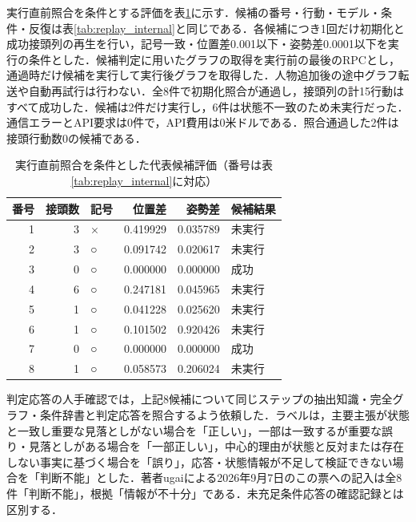 実行直前照合を条件とする評価を表\ref{tab:replay_gated}に示す．候補の番号・行動・モデル・条件・反復は表\ref{tab:replay_internal}と同じである．各候補につき1回だけ初期化と成功接頭列の再生を行い，記号一致・位置差0.001以下・姿勢差0.0001以下を実行の条件とした．候補判定に用いたグラフの取得を実行前の最後のRPCとし，通過時だけ候補を実行して実行後グラフを取得した．人物追加後の途中グラフ転送や自動再試行は行わない．全8件で初期化照合が通過し，接頭列の計15行動はすべて成功した．候補は2件だけ実行し，6件は状態不一致のため未実行だった．通信エラーとAPI要求は0件で，API費用は0米ドルである．照合通過した2件は接頭行動数0の候補である．
\begin{table}[tb]
\caption{実行直前照合を条件とした代表候補評価（番号は表\ref{tab:replay_internal}に対応）}\label{tab:replay_gated}
\centering\small
\begin{tabular}{rrlrrl}
\hline
番号 & 接頭数 & 記号 & 位置差 & 姿勢差 & 候補結果 \\
\hline
1 & 3 & × & 0.419929 & 0.035789 & 未実行 \\
2 & 3 & ○ & 0.091742 & 0.020617 & 未実行 \\
3 & 0 & ○ & 0.000000 & 0.000000 & 成功 \\
4 & 6 & ○ & 0.247181 & 0.045965 & 未実行 \\
5 & 1 & ○ & 0.041228 & 0.025620 & 未実行 \\
6 & 1 & ○ & 0.101502 & 0.920426 & 未実行 \\
7 & 0 & ○ & 0.000000 & 0.000000 & 成功 \\
8 & 1 & ○ & 0.058573 & 0.206024 & 未実行 \\
\hline
\end{tabular}
\end{table}

判定応答の人手確認では，上記8候補について同じステップの抽出知識・完全グラフ・条件辞書と判定応答を照合するよう依頼した．ラベルは，主要主張が状態と一致し重要な見落としがない場合を「正しい」，一部は一致するが重要な誤り・見落としがある場合を「一部正しい」，中心的理由が状態と反対または存在しない事実に基づく場合を「誤り」，応答・状態情報が不足して検証できない場合を「判断不能」とした．著者ugaiによる2026年9月7日のこの票への記入は全8件「判断不能」，根拠「情報が不十分」である．未充足条件応答の確認記録とは区別する．

